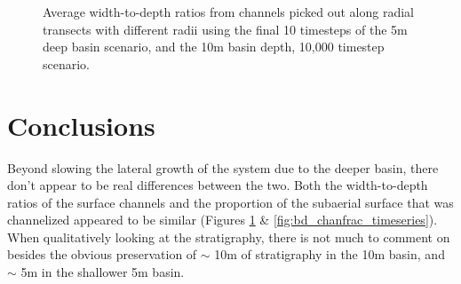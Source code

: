 \begin{figure}[!ht]
	\caption{Average width-to-depth ratios from channels picked out along radial transects with different radii using the final 10 timesteps of the 5m deep basin scenario, and the 10m basin depth, 10,000 timestep scenario.}
	\label{fig:bd_wd}
\end{figure}

\section{Conclusions}
Beyond slowing the lateral growth of the system due to the deeper basin, there don't appear to be real differences between the two.
Both the width-to-depth ratios of the surface channels and the proportion of the subaerial surface that was channelized appeared to be similar (Figures \ref{fig:bd_wd} \& \ref{fig:bd_chanfrac_timeseries}).
When qualitatively looking at the stratigraphy, there is not much to comment on besides the obvious preservation of $\sim$ 10m of stratigraphy in the 10m basin, and $\sim$ 5m in the shallower 5m basin.

\clearpage

